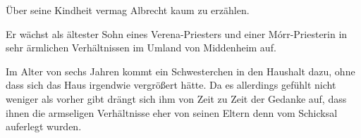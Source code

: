 Über seine Kindheit vermag Albrecht kaum zu erzählen.

Er wächst als ältester Sohn eines Verena-Priesters und einer Mórr-Priesterin in sehr ärmlichen Verhältnissen im Umland von Middenheim auf.

Im Alter von sechs Jahren kommt ein Schwesterchen in den Haushalt dazu, ohne dass sich das Haus irgendwie vergrößert hätte. Da es allerdings gefühlt nicht weniger als vorher gibt drängt sich ihm von Zeit zu Zeit der Gedanke auf, dass ihnen die armseligen Verhältnisse eher von seinen Eltern denn vom Schicksal auferlegt wurden.

